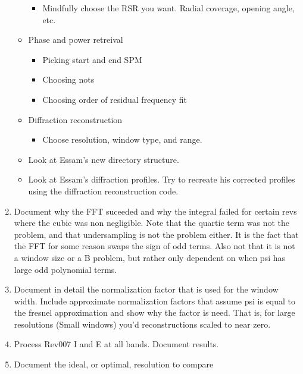 \documentclass[crop=false,class=article,oneside]{standalone}
\begin{document}
\begin{enumerate}
\begin{itemize}
\begin{itemize}
                    \item Mindfully choose the RSR you want. Radial coverage, opening angle, etc.
                \end{itemize}
                \item Phase and power retreival
                \begin{itemize}
                    \item Picking start and end SPM
                    \item Choosing nots
                    \item Choosing order of residual frequency fit
                \end{itemize}
                \item Diffraction reconstruction
                \begin{itemize}
                    \item Choose resolution, window type, and range.
                \end{itemize}
                \item Look at Essam's new directory structure.
                \item Look at Essam's diffraction profiles. Try to recreate his corrected profiles using the diffraction reconstruction code.
            \end{itemize}
            \item Document why the FFT suceeded and why the
                  integral failed for certain revs where the cubic was
                  non negligible. Note that the quartic term was not
                  the problem, and that undersampling is not the
                  problem either. It is the fact that the FFT for
                  some reason swaps the sign of odd terms. Also not
                  that it is not a window size or a B problem, but
                  rather only dependent on when psi has large odd
                  polynomial terms.
            \item Document in detail the normalization factor that
                  is used for the window width. Include approximate
                  normalization factors that assume psi is equal to
                  the fresnel approximation and show why the factor
                  is need. That is, for large resolutions
                  (Small windows) you'd reconstructions scaled
                  to near zero.
            \item Process Rev007 I and E at all bands. Document results.
            \item Document the ideal, or optimal, resolution to compare

\end{enumerate}
\end{document}

